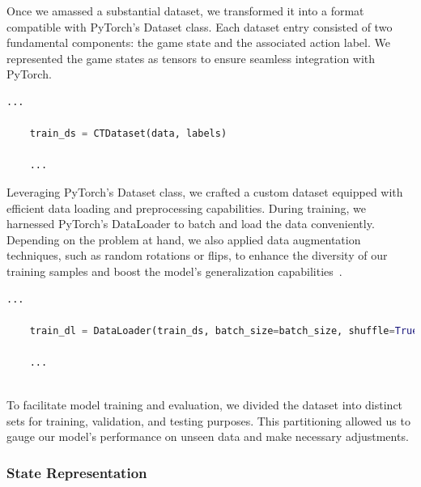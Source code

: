 Once we amassed a substantial dataset, we transformed it into a format compatible with PyTorch's Dataset class. 
Each dataset entry consisted of two fundamental components: the game state and the associated action label. We represented 
the game states as tensors to ensure seamless integration with PyTorch.

\begin{lstlisting}[language=Python]
    ...

    train_ds = CTDataset(data, labels)

    ...

\end{lstlisting}

Leveraging PyTorch's Dataset class, we crafted a custom dataset equipped with efficient data loading and preprocessing capabilities. 
During training, we harnessed PyTorch's DataLoader to batch and load the data conveniently. 
Depending on the problem at hand, we also applied data augmentation techniques, such as random rotations or flips, 
to enhance the diversity of our training samples and boost the model's generalization capabilities~\cite{Onl:dataAug}.

\begin{lstlisting}[language=Python]
    ...

    train_dl = DataLoader(train_ds, batch_size=batch_size, shuffle=True)

    ...
    
\end{lstlisting}

To facilitate model training and evaluation, we divided the dataset into distinct sets for training, validation, 
and testing purposes. This partitioning allowed us to gauge our model's performance on unseen data and make necessary adjustments.

\subsubsection*{State Representation}

